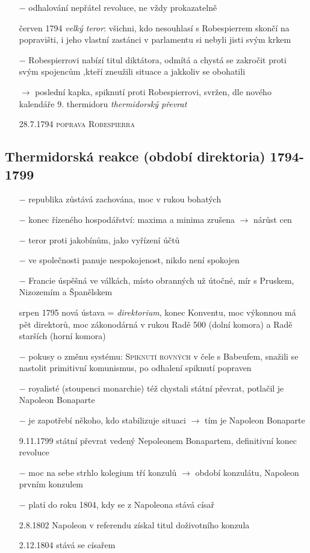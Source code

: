 \documentclass{article}
\begin{document}
\begin{itemize}
    \item[$-$] odhalování nepřátel revoluce, ne vždy prokazatelně
    \item[červen 1794] \textit{velký teror}: všichni, kdo nesouhlasí s Robespierrem skončí na popravišti, i jeho vlastní zastánci v parlamentu si nebyli jisti svým krkem
    \item[$-$] Robespierrovi nabízí titul diktátora, odmítá a chystá se zakročit proti svým spojencům ,kteří zneužili situace a jakkoliv se obohatili
    \item[$\rightarrow$ ]  poslední kapka, spiknutí proti Robespierrovi, svržen, dle nového kalendáře 9. thermidoru \textit{thermidorský převrat}
    \item[28.7.1794]  \textsc{poprava Robespierra}
\end{itemize}

\subsection*{Thermidorská reakce (období direktoria) 1794-1799}
\begin{itemize}
    \vspace{-0.5em}
    \setlength\itemsep{0.15em}
    \item[$-$] republika zůstává zachována, moc v rukou bohatých
    \item[$-$] konec řízeného hospodářství: maxima a minima zrušena $\rightarrow$ nárůst cen
    \item[$-$] teror proti jakobínům, jako vyřízení účtů
    \item[$-$] ve společnosti panuje nespokojenost, nikdo není spokojen
    \item[$-$] Francie úspěšná ve válkách, místo obranných už útočné, mír s Pruskem, Nizozemím a Španělskem
    \item[srpen 1795] nová ústava = \textit{direktorium}, konec Konventu, moc výkonnou má pět direktorů,  moc zákonodárná v rukou Radě 500 (dolní komora) a Radě starších (horní komora)
    \item[$-$] pokusy o změnu systému: \textsc{Spiknutí rovných} v čele s Babeufem, snažili se nastolit primitivní komunismus, po odhalení spiknutí popraven
    \item[$-$] royalisté (stoupenci monarchie) též chystali státní převrat, potlačil je Napoleon Bonaparte
    \item[$-$] je zapotřebí někoho, kdo stabilizuje situaci $\rightarrow$ tím je Napoleon Bonaparte
    \item[9.11.1799] státní převrat vedený Nepoleonem Bonapartem, definitivní konec revoluce
    \item[$-$] moc na sebe strhlo kolegium tří konzulů $\rightarrow$ období konzulátu, Napoleon prvním konzulem
    \item[$-$] platí do roku 1804, kdy se z Napoleona stává císař
    \item[2.8.1802] Napoleon v referendu získal titul doživotního konzula
    \item[2.12.1804] stává se císařem
\end{itemize}
\end{document}
